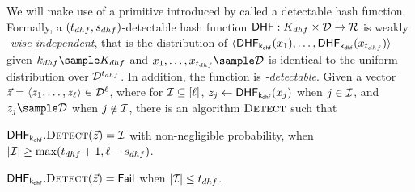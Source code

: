 %
We will make use of a primitive introduced by \citet{bhowmick2021apple} called a detectable hash 
function. Formally, a $(t_{dhf}, s_{dhf})$-detectable 
hash function $\dhf: \dhfKeySpace \times \dhfDomain \rightarrow \dhfRange$ is weakly \textit{\dhfParamMatchThreshold-wise
  independent}, that is the distribution of
  $\langle\dhf[\dhfKey](\genericFnInput[1]), \dots,
  \dhf[\dhfKey](\genericFnInput[\dhfParamMatchThreshold])\rangle$
  given $\dhfKey \getsr \dhfKeySpace$ and $\genericFnInput[1], \dots,
  \genericFnInput[\dhfParamMatchThreshold] \getsr \dhfDomain$ is
  identical to the uniform distribution over
  $\mathcal{D}^{t_{dhf}}$. In addition, the function is \textit{\dhfParamRandThreshold-detectable}. 
  Given a vector $\genericVec = \tupleDefn{\genericVec[1], \dots, 
    \genericVec[\genericVecLen]} \in \dhfDomain^{\genericVecLen}$, where for $\matchedIndexSet 
  \subseteq \nats[\genericVecLen]$, $\genericVec[\projIdx] \gets 
  \dhf[\dhfKey](\genericFnInput[\projIdx])$ when $\projIdx \in \matchedIndexSet$, 
  and $\genericVec[\projIdx] \getsr \dhfDomain$ when $\projIdx \notin \matchedIndexSet$, 
  there is an algorithm $\textsc{Detect}$ such that 

	\itemListStart
  \item $\dhf[\dhfKey].\dhfDetect(\genericVec) =
    \matchedIndexSet$ with non-negligible probability,
    when $\setSize{\matchedIndexSet} \ge
    \max(\dhfParamMatchThreshold+1, \genericVecLen -
    \dhfParamRandThreshold)$.
  \item $\dhf[\dhfKey].\dhfDetect(\genericVec) =
    \dhfFail$ when $\setSize{\matchedIndexSet} \le
    \dhfParamMatchThreshold$.
\itemListEnd
\fi 

